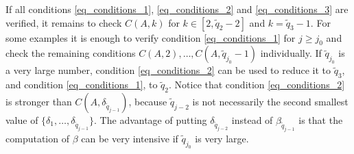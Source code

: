 \documentclass{amsart}
\begin{document}
If all conditions \eqref{eq_conditions_1}, \eqref{eq_conditions_2} and \eqref{eq_conditions_3} are verified, it remains to check $C(A,k)$ for $k \in [2, \tilde q_2 - 2]$ and $k=\tilde q_3 -1$.
For some examples it is enough to verify condition \eqref{eq_conditions_1} for $j \geq j_0$ and check the remaining conditions $C(A, 2), \ldots, C(A, \tilde q_{j_0}-1)$ individually. If $\tilde q_{j_0}$ is a very large number, condition \eqref{eq_conditions_2} can be used to reduce it to $\tilde q_3$, and condition \eqref{eq_conditions_1}, to $\tilde q_2$.
Notice that condition \eqref{eq_conditions_2} is stronger than $C(A,\delta_{\tilde q_{j-1}})$, because $\tilde q_{j-2}$ is not necessarily the second smallest value of $\{\delta_1, \ldots, \delta_{\tilde q_{j-1}} \}$. The advantage of putting $\delta_{\tilde q_{j-2}}$ instead of $\beta_{\tilde q_{j-1}}$ is that the computation of $\beta$ can be very intensive if $\tilde q_{j_0}$ is very large.
\end{document}
